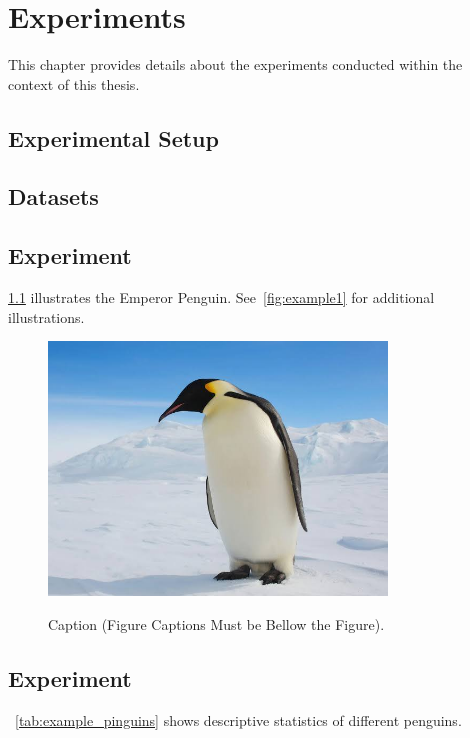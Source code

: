\chapter{Experiments}
\label{cha:experiments}

This chapter provides details about the experiments conducted within the context of this thesis. 


\section{Experimental Setup}
\label{sec:setup}

\section{Datasets}

\section{Experiment}
\label{sec:results1}

\cref{fig:example2} illustrates the Emperor Penguin. See~\cref{fig:example1} for additional illustrations.

\begin{figure}[htb]
  \centering
  \includegraphics[width=9cm]{figures/emperor.jpeg}\\
  \caption{Caption (Figure Captions Must be Bellow the Figure).}
  \label{fig:example2}
\end{figure}

\section{Experiment}
\label{sec:results2}
~\cref{tab:example_pinguins} shows descriptive statistics of different penguins.


